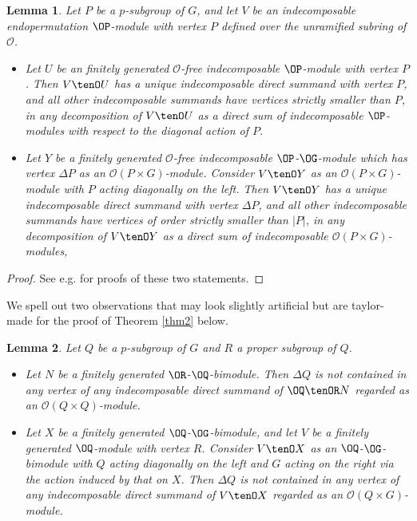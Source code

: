 \documentclass{amsart} %
\theoremstyle{plain}\newtheorem{Theorem}{Theorem}[section]
\theoremstyle{plain}\newtheorem{Conjecture}[Theorem]{Conjecture}
\theoremstyle{plain}\newtheorem{Corollary}[Theorem]{Corollary}
\theoremstyle{plain}\newtheorem{Lemma}[Theorem]{Lemma}
\theoremstyle{plain}\newtheorem{Proposition}[Theorem]{Proposition}
\theoremstyle{definition}\newtheorem{Definition}[Theorem]{Definition}
\theoremstyle{definition}\newtheorem{Example}[Theorem]{Example}
\theoremstyle{definition}\newtheorem{Examples}[Theorem]{Examples}
\theoremstyle{definition}\newtheorem{Remark}[Theorem]{Remark}
\theoremstyle{definition}\newtheorem{Remarks}[Theorem]{Remarks}
\theoremstyle{plain}\newtheorem{Statement}[Theorem]{}
\def\CO{{\mathcal{O}}}
\begin{document}
\begin{Lemma} \label{lem3}
Let $P$ be a $p$-subgroup of $G$, and let $V$ be an indecomposable
endopermutation $\OP$-module with vertex $P$ defined over the unramified
subring of $\CO$.
\begin{itemize}
\item[{\rm (i)}] 
Let $U$ be an finitely generated $\CO$-free indecomposable $\OP$-module 
with vertex $P$.
Then $V\tenO U$ has a unique indecomposable direct summand with vertex $P$,
and all other indecomposable summands have vertices strictly smaller than $P$, in
any decomposition of $V\tenO U$ as a direct sum of indecomposable
$\OP$-modules with respect to the diagonal action of $P$.
\item[{\rm (ii)}] 
Let $Y$ be a finitely generated $\CO$-free indecomposable 
$\OP$-$\OG$-module which has vertex $\Delta P$ as an $\CO(P\times G)$-module.
Consider $V\tenO Y$ as an $\CO(P\times G)$-module  with $P$ acting diagonally on 
the left.
Then $V\tenO Y$ has a unique indecomposable direct summand with vertex $\Delta P$,
and all other indecomposable summands have vertices of order strictly smaller 
than $|P|$, in
any decomposition of $V\tenO Y$ as a direct sum of indecomposable
$\CO(P\times G)$-modules, 
\end{itemize}
\end{Lemma}

\begin{proof} 
See e.g. \cite[Proposition 7.3.10, 7.3.18]{LiBookII} for proofs of these two statements.
\end{proof}


We spell out two  observations that may look slightly artificial but 
are taylor-made for the proof of Theorem
\ref{thm2} below.

\begin{Lemma} \label{lem5}
Let $Q$ be a $p$-subgroup of $G$ and $R$ a proper subgroup of $Q$.

\begin{itemize}
\item[{\rm (i)}] Let $N$ be a finitely generated $\OR$-$\OQ$-bimodule.
Then $\Delta Q$ is not contained in any vertex of any indecomposable  direct
summand of $\OQ\tenOR N$ regarded as an $\CO(Q\times Q)$-module.


\item[{\rm (ii)}] Let $X$ be a finitely generated $\OQ$-$\OG$-bimodule, and let
$V$ be a finitely generated $\OQ$-module with vertex $R$. Consider $V\tenO X$
as an $\OQ$-$\OG$-bimodule with $Q$ acting diagonally on the left and $G$
acting on the right via the action induced by that on $X$. Then
$\Delta Q$ is not contained in any vertex of any indecomposable direct
summand of $V\tenO X$ regarded as an $\CO(Q\times G)$-module.

\end{itemize}
\end{Lemma}
\end{document}
